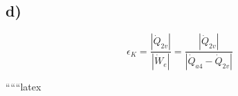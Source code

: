 

\subsection*{d)}
\[
\epsilon_K = \frac{|\dot{Q}_{2v}|}{|\dot{W}_e|} = \frac{|\dot{Q}_{2v}|}{|\dot{Q}_{a4} - \dot{Q}_{2v}|}
\]

``````latex